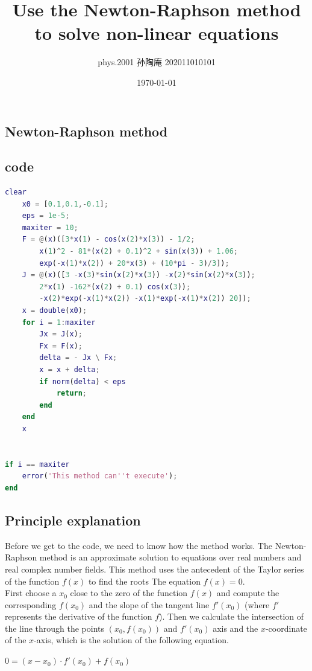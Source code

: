 \documentclass[12pt, a4paper, oneside]{ctexart}
\title{Use the Newton-Raphson method to solve non-linear equations}
\date{\today}
\author{phys.2001 孙陶庵 202011010101 }
\begin{document}
\begin{spacing}{2.0}
\tableofcontents
\maketitle
\section{Newton-Raphson method}
\subsection{code}
\begin{lstlisting}[language=Matlab, caption=Newton-Raphson method]
    clear
    x0 = [0.1,0.1,-0.1];
    eps = 1e-5;
    maxiter = 10;
    F = @(x)([3*x(1) - cos(x(2)*x(3)) - 1/2;
        x(1)^2 - 81*(x(2) + 0.1)^2 + sin(x(3)) + 1.06;
        exp(-x(1)*x(2)) + 20*x(3) + (10*pi - 3)/3]);
    J = @(x)([3 -x(3)*sin(x(2)*x(3)) -x(2)*sin(x(2)*x(3)); 
        2*x(1) -162*(x(2) + 0.1) cos(x(3));
        -x(2)*exp(-x(1)*x(2)) -x(1)*exp(-x(1)*x(2)) 20]);
    x = double(x0);
    for i = 1:maxiter
        Jx = J(x);
        Fx = F(x);
        delta = - Jx \ Fx;
        x = x + delta;
        if norm(delta) < eps
            return;
        end
    end
    x


if i == maxiter
    error('This method can''t execute');
end

    \end{lstlisting}
\subsection{Principle explanation\cite{key2}\cite{key3}}
Before we get to the code, we need to know how the method works. The Newton-Raphson method is an approximate solution to equations over real numbers and real
complex number fields. This method uses the antecedent of the Taylor series of the function $f(x)$ to find the roots
The equation $f(x)=0$. \\
First choose a $x_0$ close to the zero of the function $f(x)$ and compute the corresponding $f(x_0)$
and the slope of the tangent line $f'(x_0)$ (where $f'$ represents the derivative of the function $f$).
Then we calculate the intersection of the line through the points $(x_0, f(x_0))$ and $f'(x_0)$
axis and the $x$-coordinate of the $x$-axis, which is the solution of the following equation.
\begin{center}
    $0= (x-x_0)\cdot f'(x_0)+f(x_0)$
\end{center}


\end{spacing}
\end{document}
